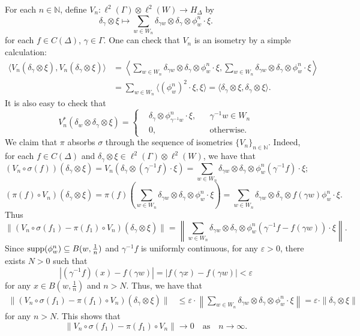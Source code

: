 \documentclass[11pt]{article}
\theoremstyle{definition}
\theoremstyle{plain}
\def\IN{\mathbb N}\def\IR{\mathbb R}\def\IE{\mathbb E}\def\IC{\mathbb C}\def\IL{\mathbb L}\def\IQ{\mathbb Q}\def\IA{\mathbb A}\def\IZ{\mathbb Z}
\def\supp{\textup{supp}}
\def\ox{\otimes}
\def\ox{\otimes}
\def\Ga{\Gamma}
\begin{document}
For each $n\in\IN$, define $V_n:\ell^2(\Ga)\ox\ell^2(W)\to H_{\Delta}$ by
$$\delta_\gamma\ox\xi\mapsto \sum_{w\in W_n}\delta_{\gamma w}\ox\delta_\gamma\ox\phi_w^n\cdot\xi.$$
for each $f\in C(\Delta)$, $\gamma\in\Ga$. One can check that $V_n$ is an isometry by a simple calculation:
\[\begin{split}\langle V_n(\delta_\gamma\ox\xi),V_n(\delta_\gamma\ox\xi)\rangle&=\left\langle\sum_{w\in W_n}\delta_{\gamma w}\ox\delta_\gamma\ox\phi_w^n\cdot\xi,\sum_{w\in W_n}\delta_{\gamma w}\ox\delta_\gamma\ox\phi_w^n\cdot\xi\right\rangle
\\&=\sum_{w\in W_n}\langle(\phi^n_w)^2\cdot\xi,\xi\rangle=\langle\delta_\gamma\ox\xi,\delta_\gamma\ox\xi\rangle.\end{split}\]
It is also easy to check that
$$V_n^*(\delta_{w}\ox\delta_\gamma\ox\xi)=\left\{\begin{aligned}&\delta_\gamma\ox\phi_{\gamma^{-1} w}^n\cdot\xi,&&\gamma^{-1} w\in W_n\\&0,&&\text{otherwise}.\end{aligned}\right.$$
We claim that $\pi$ absorbs $\sigma$ through the sequence of isometries $\{V_n\}_{n\in\IN}$. Indeed, for each $f\in C(\Delta)$ and $\delta_\gamma\ox\xi\in\ell^2(\Ga)\ox\ell^2(W)$, we have that
$$(V_n\circ \sigma(f))(\delta_\gamma\ox\xi)=V_n(\delta_\gamma\ox (\gamma^{-1}f)\cdot\xi)=\sum_{w\in W_n}\delta_{\gamma w}\ox\delta_\gamma\ox\phi_w^n(\gamma^{-1} f)\cdot\xi;$$
$$(\pi(f)\circ V_n)(\delta_\gamma\ox\xi)=\pi(f)\left(\sum_{w\in W_n}\delta_{\gamma w}\ox\delta_\gamma\ox\phi_w^n \cdot\xi\right)=\sum_{w\in W_n}\delta_{\gamma w}\ox\delta_\gamma\ox f(\gamma w)\phi_w^n\cdot\xi.$$
Thus
$$\|(V_n\circ\sigma(f_1)-\pi(f_1)\circ V_n)(\delta_\gamma\ox\xi)\|=\left\|\sum_{w\in W_n}\delta_{\gamma w}\ox\delta_\gamma\ox\phi_w^n(\gamma^{-1} f-f(\gamma w))\cdot\xi\right\|.$$
Since $\supp(\phi_{w}^n)\subseteq B(w,\frac 1n)$ and $\gamma^{-1}f$ is uniformly continuous, for any $\varepsilon>0$, there exists $N>0$ such that
$$|(\gamma^{-1}f)(x)-f(\gamma w)|=|f(\gamma x)-f(\gamma w)|<\varepsilon$$
for any $x\in B(w,\frac 1n)$ and $n>N$. Thus, we have that
\[\begin{split}\|(V_n\circ\sigma(f_1)-\pi(f_1)\circ V_n)(\delta_\gamma\ox\xi)\|&\leq\varepsilon\cdot\left\|\sum_{w\in W_n}\delta_{\gamma w}\ox\delta_\gamma\ox\phi_w^n\cdot\xi\right\|=\varepsilon\cdot\|\delta_{\gamma}\ox\xi\|\end{split}\]
for any $n>N$.
This shows that
$$\|V_n\circ\sigma(f_1)-\pi(f_1)\circ V_n\|\to 0\quad\text{as}\quad n\to\infty.$$
\end{document}
